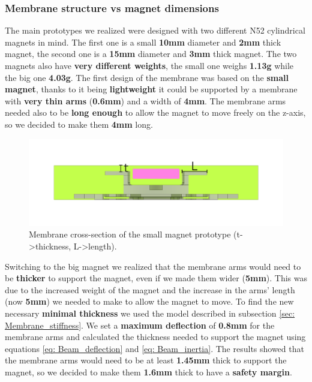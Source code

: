 \subsubsection{Membrane structure vs magnet dimensions}
The main prototypes we realized were designed with two different N52 cylindrical magnets in mind.
The first one is a small \textbf{10mm} diameter and \textbf{2mm} thick magnet, the second one is a \textbf{15mm} diameter and \textbf{3mm} thick magnet.
The two magnets also have \textbf{very different weights}, the small one weighs \textbf{1.13g} while the big one \textbf{4.03g}.
The first design of the membrane was based on the \textbf{small magnet}, thanks to it being \textbf{lightweight} it could be supported by a membrane with \textbf{very thin arms} (\textbf{0.6mm}) and a width of \textbf{4mm}.
The membrane arms needed also to be \textbf{long enough} to allow the magnet to move freely on the z-axis, so we decided to make them \textbf{4mm} long.
\begin{figure}[H]
    \centering
    \includegraphics[width = 0.9\linewidth]{Chapters/Chapter5/Flexible_Mat_Prototypes/Figures/membrane_v1_section.png}
    \caption{Membrane cross-section of the small magnet prototype (t->thickness, L->length).}
    \label{fig: Membrane_v1_section}
\end{figure}

Switching to the big magnet we realized that the membrane arms would need to be \textbf{thicker} to support the magnet, even if we made them wider (\textbf{5mm}).
This was due to the increased weight of the magnet and the increase in the arms' length (now \textbf{5mm}) we needed to make to allow the magnet to move.
To find the new necessary \textbf{minimal thickness} we used the model described in subsection \ref{sec: Membrane_stiffness}.
We set a \textbf{maximum deflection} of \textbf{0.8mm} for the membrane arms and calculated the thickness needed to support the magnet using equations \ref{eq: Beam_deflection} and \ref{eq: Beam_inertia}.
The results showed that the membrane arms would need to be at least \textbf{1.45mm} thick to support the magnet, so we decided to make them \textbf{1.6mm} thick to have a \textbf{safety margin}.


